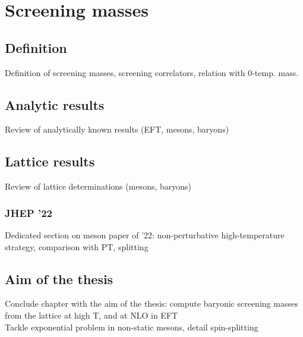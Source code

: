 \chapter{Screening masses}
\section{Definition}
Definition of screening masses, screening correlators, relation with 0-temp.
mass.
\section{Analytic results}
Review of analytically known results (EFT, mesons, baryons)
\section{Lattice results}
Review of lattice determinations (mesons, baryons)
\subsection{JHEP '22}
Dedicated section on meson paper of '22: non-perturbative high-temperature 
strategy, comparison with PT, splitting\\
\section{Aim of the thesis}
Conclude chapter with the \alert{aim of the thesis:} compute baryonic screening
masses from the lattice at high T, and at NLO in EFT\\
Tackle exponential problem in non-static mesons, detail spin-splitting
